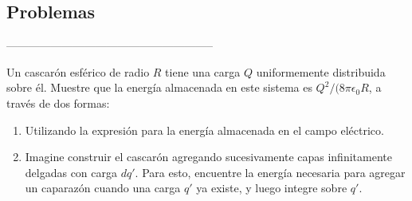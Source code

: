 \subsection{Problemas}
--------------------------------------------------------

\np
Un cascarón esférico de radio $R$ tiene una carga $Q$ uniformemente distribuida sobre él. Muestre que la energía almacenada en este sistema es $Q^2/(8\pi\epsilon_0R$, a través de dos formas:

\begin{enumerate}[label=\alph*)]
    \item Utilizando la expresión para la energía almacenada en el campo eléctrico.
    \item Imagine construir el cascarón agregando sucesivamente capas infinitamente delgadas con carga $dq'$. Para esto, encuentre la energía necesaria para agregar un caparazón cuando una carga $q'$ ya existe, y luego integre sobre $q'$.
\end{enumerate}



\newpage